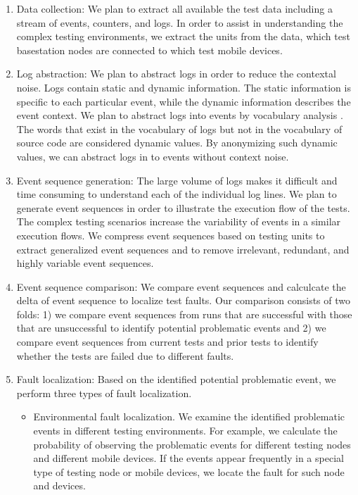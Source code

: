 \begin{enumerate}

\item Data collection: We plan to extract all available the test data including a stream of events, counters, and logs. In order to assist in understanding the complex testing environments, we extract the units from the data, \ie which test basestation nodes are connected to which test mobile devices.

\item Log abstraction: We plan to abstract logs in order to reduce the contextal noise. Logs contain static and dynamic information. The static information is specific to each particular event, while the dynamic information describes the event context. We plan to abstract logs into events by vocabulary analysis . The words that exist in the vocabulary of logs but not in the vocabulary of source code are considered dynamic values. By anonymizing such dynamic values, we can abstract logs in to events without context noise. 

\item Event sequence generation: The large volume of logs makes it difficult
and time consuming to understand each of the individual log lines. We plan to
generate event sequences in order to illustrate the execution flow of the
tests. The complex testing scenarios increase the variability of events in a
similar execution flows. We compress event sequences based on testing units to
extract generalized event sequences and to remove irrelevant, redundant, and
highly variable event sequences.

\item Event sequence comparison: We compare event sequences and calculcate the delta of event sequence to localize test faults. Our comparison consists of two folds: 1) we compare event sequences from runs that are successful with those that are unsuccessful to identify potential problematic events and 2) we compare event sequences from current tests and prior tests to identify whether the tests are failed due to different faults.

\item Fault localization: Based on the identified potential problematic event, we perform three types of fault localization. 
	\begin{itemize}
		\item Environmental fault localization. We examine the identified problematic events in different testing environments. For example, we calculate the probability of observing the problematic events for different testing nodes and different mobile devices. If the events appear frequently in a special type of testing node or mobile devices, we locate the fault for such node and devices. 
		

\end{itemize}
\end{enumerate}
